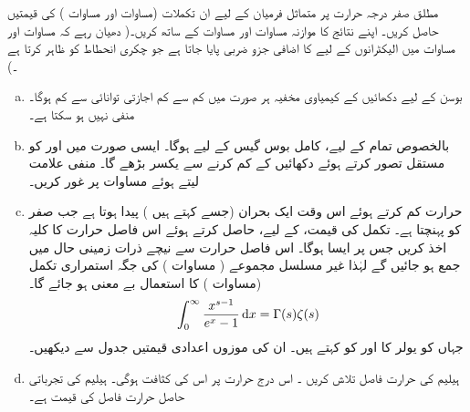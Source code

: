 مطلق صفر درجہ حرارت پر متماثل فرميان کے لیے   ان تکملات (مساوات    اور مساوات  )   کی قیمتیں حاصل کریں۔  اپنے نتائج کا موازنہ مساوات    اور مساوات     کے ساتھ کریں۔( دھیان رہے کہ مساوات     اور مساوات  میں الیکٹرانوں کے لیے  کا  اضافی جزو ضربی  پایا جاتا ہے جو چکری  انحطاط کو ظاہر کرتا ہے ۔)
\begin{enumerate}[a.]
\item
بوسن کے لیے دکھائیں کے کیمیاوی مخفیہ ہر صورت میں کم سے کم اجازتی توانائی سے کم ہوگا۔    منفی نہیں ہو سکتا ہے۔ 
\item
بالخصوص تمام  کے لیے،  کامل بوس گیس کے لیے  ہوگا۔  ایسی صورت میں  اور  کو مستقل تصور کرتے ہوئے دکھائیں کے  کم کرنے سے  یکسر بڑھے گا۔   منفی علامت لیتے ہوئے مساوات     پر غور کریں۔
\item
حرارت  کم کرتے ہوئے اس وقت ایک بحران (جسے    کہتے ہیں )  پیدا ہوتا ہے  جب  صفر کو پہنچتا ہے۔ تکمل کی قیمت،   کے لیے،  حاصل کرتے ہوئے اس فاصل حرارت   کا کلیہ اخذ کریں جس پر ایسا ہوگا۔  اس فاصل حرارت سے نیچے ذرات زمینی حال میں جمع ہو جائیں گے لہٰذا غیر مسلسل مجموعے (  مساوات  )   کی جگہ استمراری تکمل (مساوات  )   کا استعمال بے معنی ہو جائے گا۔  
\begin{align}\label{مساوات_متماثل_گاما_زیٹا}
\int_0^{\infty} \frac{x^{s - 1}}{e^x - 1} \dif x = \Gamma (s) \zeta(s)
\end{align} 
جہاں  کو  یولر  کا   اور  کو    کہتے ہیں۔ ان کی موزوں  اعدادی قیمتیں  جدول سے دیکھیں۔ 
\item
ہیلیم   کی حرارت فاصل تلاش کریں ۔ اس درج حرارت پر اس کی کثافت  ہوگی۔  ہیلیم کی تجرباتی حاصل حرارت فاصل کی قیمت  ہے۔ 
\end{enumerate}

